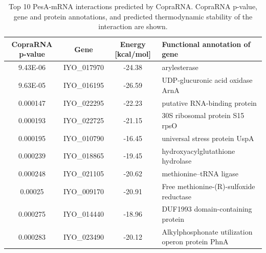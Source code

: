 \begin{table}[H]
    \footnotesize
    \centering
    \begin{tabular}{cccl}
\toprule
CopraRNA p-value & Gene & Energy [kcal/mol] & Functional annotation of gene\\
\midrule
9.43E-06 & IYO_017970 & -24.38 & arylesterase\\
9.63E-05 & IYO_016195 & -26.59 & UDP-glucuronic acid oxidase ArnA\\
0.000147 & IYO_022295 & -22.23 & putative RNA-binding protein\\
0.000193 & IYO_022725 & -21.15 & 30S ribosomal protein S15 rpsO\\
0.000195 & IYO_010790 & -16.45 & universal stress protein UspA \\
0.000239 & IYO_018865 & -19.45 & hydroxyacylglutathione hydrolase\\
0.000248 & IYO_021105 & -20.62 & methionine--tRNA ligase\\
0.00025 & IYO_009170 & -20.91 & Free methionine-(R)-sulfoxide reductase\\
0.000275 & IYO_014440 & -18.96 & DUF1993 domain-containing protein \\
0.000283 & IYO_023490 & -20.12 & Alkylphosphonate utilization operon protein PhnA\\
\bottomrule
    \end{tabular}
    \caption[Top 10 PesA-mRNA interactions predicted by CopraRNA]{Top 10 PesA-mRNA interactions predicted by CopraRNA. CopraRNA p-value, gene and protein annotations, and predicted thermodynamic stability of the interaction are shown.}
    \label{tab:COPRARNA}
\end{table}


